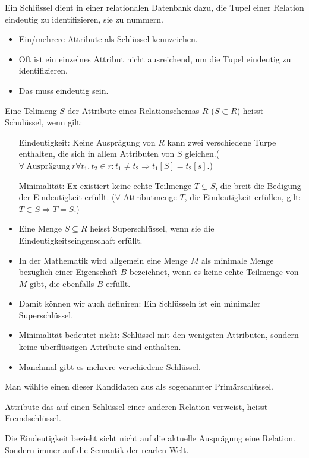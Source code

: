 \begin{definition}
    Ein Schlüssel dient in einer relationalen Datenbank dazu, die Tupel einer Relation eindeutig zu identifizieren, sie zu nummern.
\end{definition}
\begin{remark}
    \begin{itemize}
        \item Ein/mehrere Attribute als Schl\"ussel kennzeichen.
        \item Oft ist ein einzelnes Attribut nicht ausreichend, um die Tupel eindeutig zu identifizieren.
        \item Das muss eindeutig sein.
    \end{itemize}
\end{remark}
\begin{definition}
    Eine Telimeng $S$ der Attribute eines Relationschemas $R$ ($S\subset R$) heisst Schul\"ussel, wenn gilt:
    \begin{enumerate}
        \item[Eindeutigkeit:] Keine Auspr\"agung von $R$ kann zwei verschiedene Turpe enthalten, die sich in allem Attributen von $S$ gleichen.($\forall \ \text{Auspr\"agung} \  r\forall t_1,t_2 \in r:t_1\not = t_2 \Rightarrow t_1[S] = t_2[s].$)
        \item[Minimalit\"at:] Ex existiert keine echte Teilmenge $T\subsetneq S$, die breit die Bedigung der Eindeutigkeit erf\"ullt. ($\forall$ Attributmenge $T$, die Eindeutigkeit erf\"ullen, gilt: $T\subset S \Rightarrow T=S$.)
    \end{enumerate}
\end{definition}
\begin{remark}
    \begin{itemize}
        \item Eine Menge $S\subseteq R$ heisst Superschl\"ussel, wenn sie die Eindeutigkeitseingenschaft erf\"ullt.
        \item In der Mathematik wird allgemein eine Menge $M$ als minimale Menge bez\"uglich einer Eigenschaft $B$ bezeichnet, wenn es keine echte Teilmenge von $M$ gibt, die ebenfalls $B$ erf\"ullt.
        \item Damit k\"onnen wir auch definiren: Ein Schl\"usseln ist ein minimaler Superschl\"ussel.
        \item Minimalit\"at bedeutet nicht: Schl\"ussel mit den wenigsten Attributen, sondern keine \"uberfl\"ussigen Attribute sind enthalten.
        \item Manchmal gibt es mehrere verschiedene Schl\"ussel.
    \end{itemize}
\end{remark}
Man w\"ahlte einen dieser Kandidaten aus als sogenannter Prim\"arschl\"ussel.
\begin{definition}
    Attribute das auf einen Schl\"ussel einer anderen Relation verweist, heisst Fremdschl\"ussel.
\end{definition}
\begin{remark}
    Die Eindeutigkeit bezieht sicht nicht auf die aktuelle Auspr\"agung eine Relation. Sondern immer auf die Semantik der rearlen Welt.
\end{remark}


